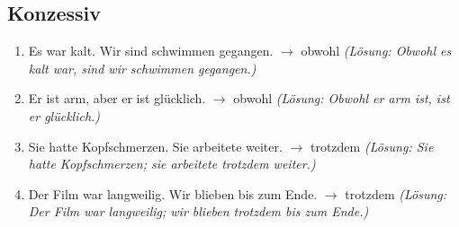 \subsection{Konzessiv}
\begin{enumerate}
    \item Es war kalt. Wir sind schwimmen gegangen. $\rightarrow$ obwohl \quad \textit{(Lösung: Obwohl es kalt war, sind wir schwimmen gegangen.)}
    \item Er ist arm, aber er ist glücklich. $\rightarrow$ obwohl \quad \textit{(Lösung: Obwohl er arm ist, ist er glücklich.)}
    \item Sie hatte Kopfschmerzen. Sie arbeitete weiter. $\rightarrow$ trotzdem \quad \textit{(Lösung: Sie hatte Kopfschmerzen; sie arbeitete trotzdem weiter.)}
    \item Der Film war langweilig. Wir blieben bis zum Ende. $\rightarrow$ trotzdem \quad \textit{(Lösung: Der Film war langweilig; wir blieben trotzdem bis zum Ende.)}
\end{enumerate}

\chapterend
